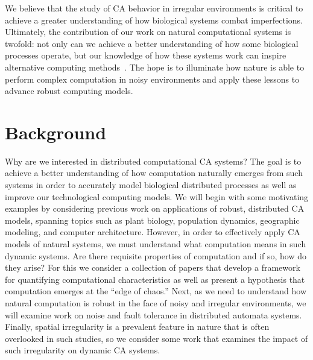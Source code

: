 \documentclass[a4paper,11pt]{article}
\begin{document}
We believe that the study of CA behavior in irregular environments is critical to achieve a greater understanding of how biological systems combat imperfections. Ultimately, the contribution of our work on natural computational systems is twofold: not only can we achieve a better understanding of how some biological processes operate, but our knowledge of how these systems work can inspire alternative computing methods~\cite{ma96, si04}. The hope is to illuminate how nature is able to perform complex computation in noisy environments and apply these lessons to advance robust computing models.

\section{Background}
\label{sec:Back}

Why are we interested in distributed computational CA systems? The goal is to achieve a better understanding of how computation naturally emerges from such systems in order to accurately model biological distributed processes as well as improve our technological computing models. We will begin with some motivating examples by considering previous work on applications of robust, distributed CA models, spanning topics such as plant biology, population dynamics, geographic modeling, and computer architecture. However, in order to effectively apply CA models of natural systems, we must understand what computation means in such dynamic systems. Are there requisite properties of computation and if so, how do they arise? For this we consider a collection of papers that develop a framework for quantifying computational characteristics as well as present a hypothesis that computation emerges at the ``edge of chaos.'' Next, as we need to understand how natural computation is robust in the face of noisy and irregular environments, we will examine work on noise and fault tolerance in distributed automata systems. Finally, spatial irregularity is a prevalent feature in nature that is often overlooked in such studies, so we consider some work that examines the impact of such irregularity on dynamic CA systems.
\end{document}
